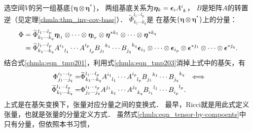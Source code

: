 选空间$V$的另一组基底$\{\boldsymbol{\eta}\otimes\boldsymbol{\eta}^{*}\}$，
两组基底关系为$\boldsymbol{\eta}_k = \boldsymbol{\epsilon}_i A_{\hphantom{i} k} ^i$，
$B$是矩阵$A$的转置逆（见定理\ref{chmla:thm_inv-cov-base}）．
$\widetilde{\Phi}^{l_1 \cdots l_p} _{k_1 \cdots k_q}$是
在基矢$\{\boldsymbol{\eta}\otimes\boldsymbol{\eta}^{*}\}$上的分量：
\begin{align*}
    \Phi &= \widetilde{\Phi}_{k_1 \cdots k_q} ^{l_1 \cdots l_p}
    \boldsymbol{\eta}_{l_1} \otimes\cdots\otimes \boldsymbol{\eta}_{l_p} \otimes
    \boldsymbol{\eta}^{*k_1} \otimes\cdots\otimes \boldsymbol{\eta}^{*k_q} \notag \\
    &= \widetilde{\Phi}_{k_1 \cdots k_q} ^{l_1 \cdots l_p}
    A_{\hphantom{i_p} l_1} ^{i_1}\cdots A_{\hphantom{i_p} l_p} ^{i_p}
    B_{j_1}^{\hphantom{i_p} k_1} \cdots B_{j_q}^{\hphantom{i_p} k_q}
    \boldsymbol{\epsilon}_{i_1} \otimes\cdots\otimes \boldsymbol{\epsilon}_{i_p} \otimes
    \boldsymbol{\epsilon}^{*j_1} \otimes\cdots\otimes \boldsymbol{\epsilon}^{*j_q} .
\end{align*}
结合式\eqref{chmla:eqn_tmp201}，利用式\eqref{chmla:eqn_tmp203}消掉上式中的基矢，有
\begin{subequations}\label{chmla:eqn_tensor-by-compoents}
\begin{align}
	\Phi^{i_1 \cdots i_p} _{j_1 \cdots j_q} = & \widetilde{\Phi}_{k_1 \cdots k_q} ^{l_1 \cdots l_p}
	A_{\hphantom{i_1} l_1} ^{i_1}\cdots A_{\hphantom{i_p} l_p} ^{i_p}
	B_{j_1}^{\hphantom{j_1} k_1} \cdots B_{j_q}^{\hphantom{j_q} k_q}
	\quad { \Longleftrightarrow } \\
    \widetilde{\Phi}^{l_1 \cdots l_p} _{k_1 \cdots k_q} =& \Phi^{i_1 \cdots i_p} _{j_1 \cdots j_q}
      A_{\hphantom{j_1} k_1}^{j_1} \cdots A_{\hphantom{j_q} k_q}^{j_q}  
      B_{i_1}^{\hphantom{i_1} l_1} \cdots B_{i_p}^{\hphantom{i_p} l_p} . 
\end{align}
\end{subequations}
上式是在基矢变换下，张量对应分量之间的变换式．  
最早，Ricci就是用此式定义张量，也就是张量的分量定义方式．
虽然式\eqref{chmla:eqn_tensor-by-compoents}中只有分量，但依照本书习惯，

